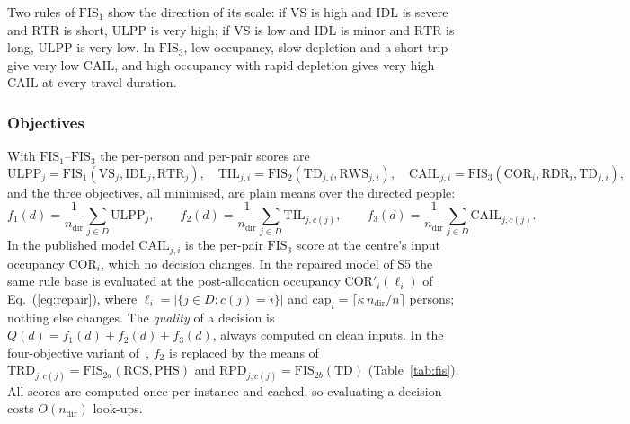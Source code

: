 Two rules of $\mathrm{FIS}_1$ show the direction of its scale: if $\mathrm{VS}$ is high and
$\mathrm{IDL}$ is severe and $\mathrm{RTR}$ is short, $\mathrm{ULPP}$ is very high; if
$\mathrm{VS}$ is low and $\mathrm{IDL}$ is minor and $\mathrm{RTR}$ is long, $\mathrm{ULPP}$ is
very low. In $\mathrm{FIS}_3$, low occupancy, slow depletion and a short trip give very low
$\mathrm{CAIL}$, and high occupancy with rapid depletion gives very high $\mathrm{CAIL}$ at
every travel duration.

\subsubsection{Objectives}
With $\mathrm{FIS}_1$--$\mathrm{FIS}_3$ the per-person and per-pair scores are
\begin{equation}\label{eq:scores}
\mathrm{ULPP}_j=\mathrm{FIS}_1(\mathrm{VS}_j,\mathrm{IDL}_j,\mathrm{RTR}_j),\quad
\mathrm{TIL}_{j,i}=\mathrm{FIS}_2(\mathrm{TD}_{j,i},\mathrm{RWS}_{j,i}),\quad
\mathrm{CAIL}_{j,i}=\mathrm{FIS}_3(\mathrm{COR}_i,\mathrm{RDR}_i,\mathrm{TD}_{j,i}),
\end{equation}
and the three objectives, all minimised, are plain means over the directed people:
\begin{equation}\label{eq:objectives}
f_1(d)=\frac{1}{n_{\mathrm{dir}}}\sum_{j\in D}\mathrm{ULPP}_j,\qquad
f_2(d)=\frac{1}{n_{\mathrm{dir}}}\sum_{j\in D}\mathrm{TIL}_{j,c(j)},\qquad
f_3(d)=\frac{1}{n_{\mathrm{dir}}}\sum_{j\in D}\mathrm{CAIL}_{j,c(j)}.
\end{equation}
In the published model $\mathrm{CAIL}_{j,i}$ is the per-pair $\mathrm{FIS}_3$ score at the
centre's input occupancy $\mathrm{COR}_i$, which no decision changes. In the repaired model of
S5 the same rule base is evaluated at the post-allocation occupancy
$\mathrm{COR}'_i(\ell_i)$ of Eq.~(\ref{eq:repair}), where $\ell_i=|\{j\in D: c(j)=i\}|$ and
$\mathrm{cap}_i=\lceil\kappa\,n_{\mathrm{dir}}/n\rceil$ persons; nothing else changes. The
\emph{quality} of a decision is $Q(d)=f_1(d)+f_2(d)+f_3(d)$, always computed on clean inputs.
In the four-objective variant of~\cite{rabiei2026resilient}, $f_2$ is replaced by the means of
$\mathrm{TRD}_{j,c(j)}=\mathrm{FIS}_{2a}(\mathrm{RCS},\mathrm{PHS})$ and
$\mathrm{RPD}_{j,c(j)}=\mathrm{FIS}_{2b}(\mathrm{TD})$ (Table~\ref{tab:fis}). All scores are
computed once per instance and cached, so evaluating a decision costs $O(n_{\mathrm{dir}})$
look-ups.


